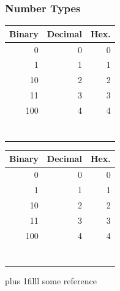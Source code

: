 \documentclass[fleqn]{beamer} %
\newcommand{\sectionIsubsectionIItitle}{Number Types}
\newcommand{\btVFill}{\vskip0pt plus 1filll}
\begin{document}
			\begin{frame}
				\frametitle{\sectionIsubsectionIItitle} \small
				\bigskip

				\begin{multicols}{2}
				\begin{tabular}{|r|r|r|} \hline
					Binary 	& Decimal 	& Hex. \\ \hline
					0		& 0			& 0 		\\ \hline	
					1		& 1			& 1 		\\ \hline
					10		& 2			& 2 		\\ \hline
					11		& 3			& 3 		\\ \hline
					100		& 4			& 4 		\\ \hline
					& 			&  		\\ \hline
					& 			&  		\\ \hline
					& 			&  		\\ \hline
					& 			&  		\\ \hline
					& 			&  		\\ \hline
					& 		&  		\\ \hline
					& 		&  		\\ \hline
				\end{tabular}

				\begin{tabular}{|r|r|r|} \hline
					Binary\hspace{18mm} 	& Decimal 	& Hex. \\ \hline
					0		& 0			& 0 		\\ \hline	
					1		& 1			& 1 		\\ \hline
					10		& 2			& 2 		\\ \hline
					11		& 3			& 3 		\\ \hline
					100		& 4			& 4 		\\ \hline
					& 			&  		\\ \hline
					& 			&  		\\ \hline
					& 			&  		\\ \hline
					& 			&  		\\ \hline
					& 			&  		\\ \hline
					& 		&  		\\ \hline
					& 		&  		\\ \hline
				\end{tabular}
				\end{multicols}

				\btVFill
				\tiny{some reference}	


			\end{frame}
\end{document}
